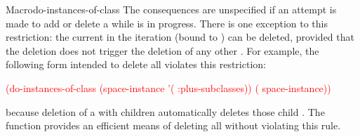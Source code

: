 \documentclass[10pt,twoside,english,pdftex]{article}
\begin{document}
\begin{functiondoc}{Macro}{do-instances-of-class}
\fnnote {}%
%
%
The consequences are unspecified if an attempt is made to add or delete a
 while  is in
progress.  There is one exception to this restriction: the current
 in the iteration (bound to ) can be deleted,
provided that the deletion does not trigger the deletion of any other
.  For example, the following form intended to delete
all  violates this restriction:
%
\W\supp
\begin{example}
   \textcolor{red}{(do-instances-of-class (space-instance '( :plus-subclasses))
     ( space-instance))}
\end{example}
%
because deletion of a  with children automatically
deletes those child .  The function
 provides an efficient
means of deleting all  without violating this rule.

\end{functiondoc}

\end{document}
